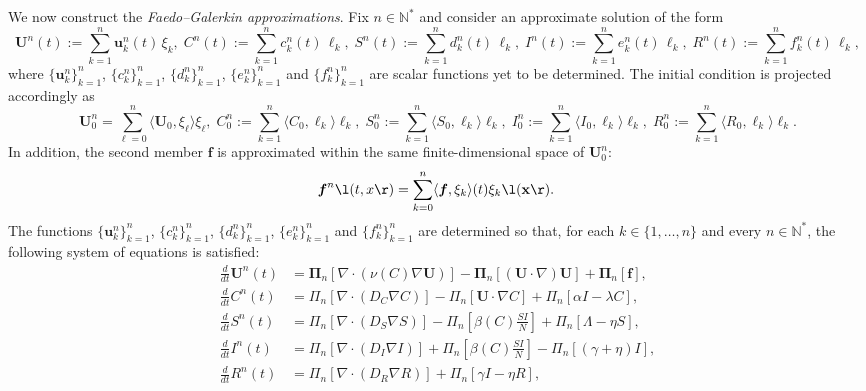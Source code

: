 \documentclass[10pt,number,preprint,times]{elsarticle}
\numberwithin{equation}{section} %
\begin{document}
	\medskip
	\noindent
	We now construct the \emph{Faedo--Galerkin approximations}. 
	Fix $n \in \mathbb{N}^*$ and consider an approximate solution of the form
	\[
	\boldsymbol{U}^n(t) := \sum_{k=1}^n \boldsymbol{u}_k^n(t) \, \xi_k, \; C^n(t) := \sum_{k=1}^n c_k^n(t) \, \ell_k, \;  S^n(t) := \sum_{k=1}^n d_k^n(t) \, \ell_k, \; I^n(t) := \sum_{k=1}^n e_k^n(t) \, \ell_k, \; R^n(t) := \sum_{k=1}^n f_k^n(t) \, \ell_k,
	\]
	where $\{\boldsymbol{u}_k^n\}_{k=1}^n$, $\{c_k^n\}_{k=1}^n$, $\{d_k^n\}_{k=1}^n$, $\{e_k^n\}_{k=1}^n$ and $\{f_k^n\}_{k=1}^n$ are scalar functions yet to be determined. The initial condition is projected accordingly as
	\[
	\boldsymbol{U}^n_0=\sum_{\ell=0}^{n}\langle \boldsymbol{U}_0, \xi_{\ell} \rangle\xi_\ell, \; C^n_0 := \sum_{k=1}^n \langle C_0, \ell_k \rangle \ell_k, \;  S^n_0 := \sum_{k=1}^n \langle S_0, \ell_k \rangle \ell_k, \; I^n_0 := \sum_{k=1}^n \langle I_0, \ell_k \rangle \ell_k, \; R^n_0 := \sum_{k=1}^n \langle R_0, \ell_k \rangle \ell_k.
	\]
	In addition, the second member $\boldsymbol{f}$ is approximated within the same finite-dimensional space of $\boldsymbol{U}_0^n$:
	\[
	\boldsymbol{f}^n\l(t,x\r)=\sum_{k=0}^{n}\langle\boldsymbol{f},\xi_k\rangle (t)\xi_k\l(\mathbf{x}\r). \; 
	\]
	The functions  $\{\boldsymbol{u}_k^n\}_{k=1}^n$, $\{c_k^n\}_{k=1}^n$, $\{d_k^n\}_{k=1}^n$, $\{e_k^n\}_{k=1}^n$ and $\{f_k^n\}_{k=1}^n$ are determined so that, for each 
	$k \in \{1,\dots,n\}$ and every $n \in \mathbb{N}^*$, the following system of equations is satisfied:
	\begin{equation}\label{eq:approx-eqn-integrated}
		\begin{split}
			\frac{d}{dt} \boldsymbol{U}^n(t)&=
			 \boldsymbol{\Pi}_n \left[\nabla \cdot \left(\nu(C) \nabla \boldsymbol{U} \right) \right] - \boldsymbol{\Pi}_n \left[(\boldsymbol{U}\cdot\nabla)\boldsymbol{U} \right]
			+ \boldsymbol{\Pi}_n[\boldsymbol{f}]
			,
\\
			\frac{d}{dt} C^n(t) &=
			\Pi_n \left[\nabla \cdot \left(D_C \nabla C \right) \right]- \Pi_n \left[\boldsymbol{U} \cdot  \nabla C  \right]+\Pi_n\left[\alpha I-\lambda C\right]
		,
\\
			  \frac{d}{dt} S^n(t)&=
			  \Pi_n \left[\nabla \cdot \left(D_S \nabla S \right) \right] -\Pi_n \left[ \beta(C)\frac{SI}{N} \right]
               + \Pi_n\left[\Lambda-\eta S\right]	%
			,
\\ 
			 \frac{d}{dt} I^n(t)&= \Pi_n \left[\nabla \cdot \left(D_I \nabla I \right) \right] +  \Pi_n \left[ \beta(C)\frac{SI}{N} \right]
			- \Pi_n\left[(\gamma+\eta)I \right]	
			,
\\ 
			  \frac{d}{dt} R^n(t)&= \Pi_n \left[\nabla \cdot \left(D_R \nabla R \right) \right]
			  + \Pi_n\left[\gamma I-\eta R\right]	%
		,
		\end{split}
	\end{equation}
\end{document}
